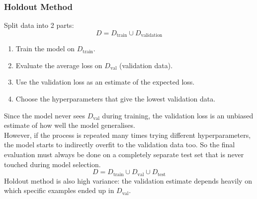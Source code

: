 \documentclass[../Probability.tex]{subfiles}
\begin{document}
\subsubsection{Holdout Method}
Split data into 2 parts:
$$D = D_{\text{train}} \cup D_{\text{validation}}$$
\begin{enumerate}
    \item Train the model on $D_{\text{train}}$.
    \item Evaluate the average loss on $D_{\text{val}}$ (validation data).
    \item Use the validation loss as an estimate of the expected loss.
    \item Choose the hyperparameters that give the lowest validation data.
\end{enumerate}
Since the model never sees $D_{\text{val}}$ during training, the validation loss is an unbiased estimate of how well the model generalises.\\
However, if the process is repeated many times trying different hyperparameters, the model starts to indirectly overfit to the validation data too. So the final evaluation must always be done on a completely separate test set that is never touched during model selection.
$$D = D_{\text{train}} \cup D_{\text{val}} \cup D_{\text{test}}$$
Holdout method is also high variance: the validation estimate depends heavily on which specific examples ended up in $D_{\text{val}}$.
\end{document}
